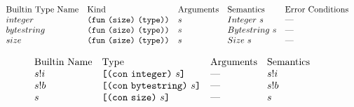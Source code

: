 \documentclass[../main.tex]{subfiles}
\begin{document}
    
    
\begin{figure*}[t]
    \footnotesize
    \centering
    
    \[\begin{array}{lllll}
        \textrm{Builtin Type Name} & \textrm{Kind} & \textrm{Arguments} & \textrm{Semantics} & \textrm{Error Conditions}\\
        
        integer & \texttt{(} \texttt{fun} ~ \texttt{(} \texttt{size} \texttt{)}{} ~ \texttt{(} \texttt{type} \texttt{)}{} \texttt{)} & s & Integer ~ s & \textrm{---}\\
        
        bytestring & \texttt{(} \texttt{fun} ~ \texttt{(} \texttt{size} \texttt{)}{} ~ \texttt{(} \texttt{type} \texttt{)}{} \texttt{)} & s & Bytestring ~ s & \textrm{---}\\
        
        size & \texttt{(} \texttt{fun} ~ \texttt{(} \texttt{size} \texttt{)}{} ~ \texttt{(} \texttt{type} \texttt{)}{} \texttt{)} & s & Size ~ s & \textrm{---}\\
    \end{array}\]
    
    \[\begin{array}{lllll}
        \textrm{Builtin Name} & \textrm{Type} & \textrm{Arguments} & \textrm{Semantics}\\
        
        s!i   & \texttt{[} \texttt{(} \texttt{con} ~ \texttt{integer} \texttt{)} ~ s \texttt{]}      &   \textrm{---}   &    s!i\\
        
        s!b   & \texttt{[} \texttt{(} \texttt{con} ~ \texttt{bytestring} \texttt{)} ~ s \texttt{]}   &   \textrm{---}   &    s!b    &\\
        
        s     & \texttt{[} \texttt{(} \texttt{con} ~ \texttt{size} \texttt{)} ~ s \texttt{]}         &   \textrm{---}   &    s      &\\
        

\end{array}\]
\end{figure*}
\end{document}
